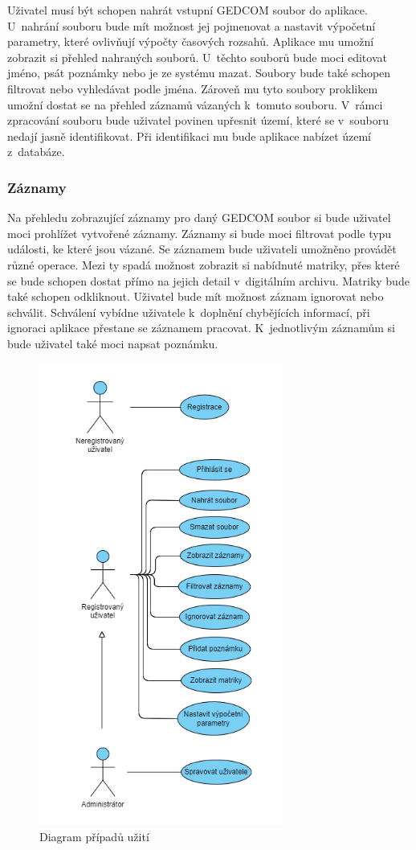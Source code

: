 Uživatel musí být schopen nahrát vstupní GEDCOM soubor do aplikace. U~nahrání souboru bude mít možnost jej pojmenovat a nastavit výpočetní parametry, které ovlivňují výpočty časových rozsahů. Aplikace mu umožní zobrazit si přehled nahraných souborů. U~těchto souborů bude moci editovat jméno, psát poznámky nebo je ze systému mazat. Soubory bude také schopen filtrovat nebo vyhledávat podle jména. Zároveň mu tyto soubory proklikem umožní dostat se na přehled záznamů vázaných k~tomuto souboru. V~rámci zpracování souboru bude uživatel povinen upřesnit území, které se v~souboru nedají jasně identifikovat. Při identifikaci mu bude aplikace nabízet území z~databáze.

\subsubsection{Záznamy}

Na přehledu zobrazující záznamy pro daný GEDCOM soubor si bude uživatel moci prohlížet vytvořené záznamy. Záznamy si bude moci filtrovat podle typu události, ke které jsou vázané. Se záznamem bude uživateli umožněno provádět různé operace. Mezi ty spadá možnost zobrazit si nabídnuté matriky, přes které se bude schopen dostat přímo na jejich detail v~digitálním archivu. Matriky bude také schopen odkliknout. Uživatel bude mít možnost záznam ignorovat nebo schválit. Schválení vybídne uživatele k~doplnění chybějících informací, při ignoraci aplikace přestane se záznamem pracovat. K~jednotlivým záznamům si bude uživatel také moci napsat poznámku.

\begin{figure}[H]
	\centering
	\includegraphics[height=152mm]{obrazky-figures/UseCase.png}
	\caption[Usecase]{Diagram případů užití}
	\label{figure_usecase}
\end{figure}

